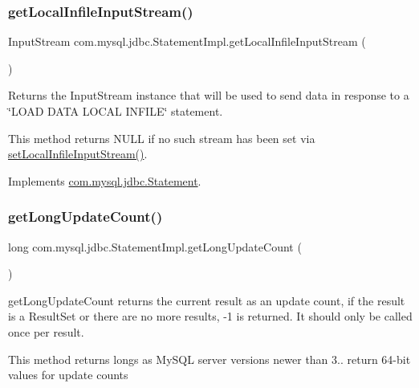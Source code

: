 \subsubsection{\texorpdfstring{get\+Local\+Infile\+Input\+Stream()}{getLocalInfileInputStream()}}
{\footnotesize\ttfamily Input\+Stream com.\+mysql.\+jdbc.\+Statement\+Impl.\+get\+Local\+Infile\+Input\+Stream (\begin{DoxyParamCaption}{ }\end{DoxyParamCaption})}

Returns the Input\+Stream instance that will be used to send data in response to a \char`\"{}\+L\+O\+A\+D D\+A\+T\+A L\+O\+C\+A\+L I\+N\+F\+I\+L\+E\char`\"{} statement.

This method returns N\+U\+LL if no such stream has been set via \mbox{\hyperlink{classcom_1_1mysql_1_1jdbc_1_1_statement_impl_ae2d3d7d72cfa5be301a49828f8bfa126}{set\+Local\+Infile\+Input\+Stream()}}. 

Implements \mbox{\hyperlink{interfacecom_1_1mysql_1_1jdbc_1_1_statement_a8d6f52df95db141768cab717ef315038}{com.\+mysql.\+jdbc.\+Statement}}.

\mbox{\label{classcom_1_1mysql_1_1jdbc_1_1_statement_impl_a698a1458d2109c83b0e3beaec53ce933}} 
\subsubsection{\texorpdfstring{get\+Long\+Update\+Count()}{getLongUpdateCount()}}
{\footnotesize\ttfamily long com.\+mysql.\+jdbc.\+Statement\+Impl.\+get\+Long\+Update\+Count (\begin{DoxyParamCaption}{ }\end{DoxyParamCaption})}

get\+Long\+Update\+Count returns the current result as an update count, if the result is a Result\+Set or there are no more results, -\/1 is returned. It should only be called once per result.

This method returns longs as My\+S\+QL server versions newer than 3.. return 64-\/bit values for update counts 

